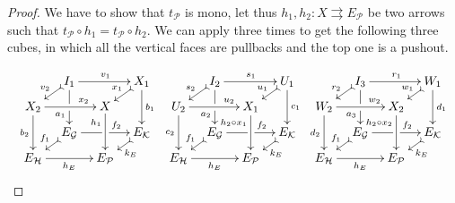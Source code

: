 \documentclass[runningheads,envcountsect]{llncs}
\def\E{\textbf {\textup{E}}}
\begin{document}
\begin{proof}
We have to show that $t_{\mathcal{P}}$ is mono, let thus $h_1, h_2\colon X\rightrightarrows E_{\mathcal{P}}$ be two arrows such that $t_\mathcal{P}\circ h_1=t_{\mathcal{P}}\circ h_2$. We can apply three times  to get the following three cubes, in which all the vertical faces are pullbacks and the top one is a pushout.

\[
\xymatrix@C=9pt@R=6pt{&I_1\ar[dd]|\hole_(.65){a_1}\ar[rr]^{v_1} \ar@{>->}[dl]_{v_2} && X_1 \ar[dd]^{b_1} \ar@{>->}[dl]_{x_1}  && I_2\ar[dd]|\hole_(.65){a_2}\ar[rr]^{s_1} \ar@{>->}[dl]_{s_2} && U_1 \ar[dd]^{c_1} \ar@{>->}[dl]_{u_1}  && I_3\ar[dd]|\hole_(.65){a_3}\ar[rr]^{r_1} \ar@{>->}[dl]_{r_2} && W_1 \ar[dd]^{d_1} \ar@{>->}[dl]_{w_1} \\ X_2  \ar[dd]_{b_2}\ar[rr]^(.7){x_2} & & X \ar[dd]_(.3){h_1} &&  U_2  \ar[dd]_{c_2}\ar[rr]^(.7){u_2} & & X_1 \ar[dd]_(.3){h_2\circ x_1} &  &W_2  \ar[dd]_{d_2}\ar[rr]^(.7){w_2} & & X_2 \ar[dd]_(.3){h_2\circ x_2 }\\&E_{\mathcal{G}}\ar[rr]|\hole^(.65){f_2} \ar@{>->}[dl]_{f_1} && E_{\mathcal{K}} \ar@{>->}[dl]^{k_E}  & & E_{\mathcal{G}}\ar[rr]|\hole^(.65){f_2} \ar@{>->}[dl]_{f_1} && E_{\mathcal{K}} \ar@{>->}[dl]^{k_E} && E_{\mathcal{G}}\ar[rr]|\hole^(.65){f_2} \ar@{>->}[dl]_{f_1} && E_{\mathcal{K}} \ar@{>->}[dl]^{k_E} \\E_{\mathcal{H}} \ar[rr]_{h_E} & & E_{\mathcal{P}} & &E_{\mathcal{H}} \ar[rr]_{h_E} & & E_{\mathcal{P}}  && E_{\mathcal{H}} \ar[rr]_{h_E} & & E_{\mathcal{P}} }\]


\end{proof}
\end{document}
